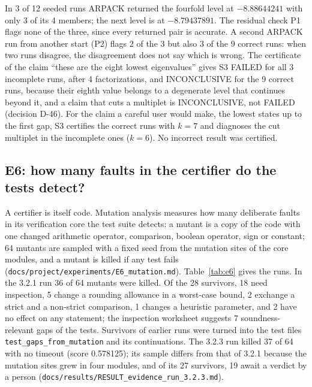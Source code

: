 \documentclass[11pt,a4paper]{article}
\newcommand{\code}[1]{\texttt{#1}}
\newcommand{\status}[1]{\textsf{#1}}
\newcommand{\FAIL}{\status{FAILED}}
\newcommand{\INC}{\status{INCONCLUSIVE}}
\begin{document}
In 3 of 12 seeded runs ARPACK returned the fourfold level at $-8.88644241$ with only 3 of its 4 members; the next
level is at $-8.79437891$. The residual check P1 flags none of the three, since every returned pair is accurate. A
second ARPACK run from another start (P2) flags 2 of the 3 but also 3 of the 9 correct runs: when two runs disagree,
the disagreement does not say which is wrong. The certificate of the claim ``these are the eight lowest eigenvalues''
gives S3 \FAIL{} for all 3 incomplete runs, after 4 factorizations, and \INC{} for the 9 correct runs, because their
eighth value belongs to a degenerate level that continues beyond it, and a claim that cuts a multiplet is \INC, not
\FAIL{} (decision D-46). For the claim a careful user would make, the lowest states up to the first gap, S3 certifies
the correct runs with $k=7$ and diagnoses the cut multiplet in the incomplete ones ($k=6$). No incorrect result was
certified.

\subsection{E6: how many faults in the certifier do the tests detect?}
\label{sec:e6}

A certifier is itself code. Mutation analysis measures how many deliberate faults in its verification core the test
suite detects: a mutant is a copy of the code with one changed arithmetic operator, comparison, boolean operator, sign
or constant; 64 mutants are sampled with a fixed seed from the mutation sites of the core modules, and a mutant is
killed if any test fails (\code{docs/project/experiments/E6\_mutation.md}). Table~\ref{tab:e6} gives the runs. In the
3.2.1 run 36 of 64 mutants were killed. Of the 28 survivors, 18 need inspection, 5 change a rounding allowance in a
worst-case bound, 2 exchange a strict and a non-strict comparison, 1 changes a heuristic parameter, and 2 have no
effect on any statement; the inspection worksheet suggests 7 soundness-relevant gaps of the tests. Survivors of
earlier runs were turned into the test files \code{test\_gaps\_from\_mutation} and its continuations. The 3.2.3 run
killed 37 of 64 with no timeout (score 0.578125); its sample differs from that of 3.2.1 because the mutation sites
grew in four modules, and of its 27 survivors, 19 await a verdict by a person
(\code{docs/results/RESULT\_evidence\_run\_3.2.3.md}).
\end{document}
